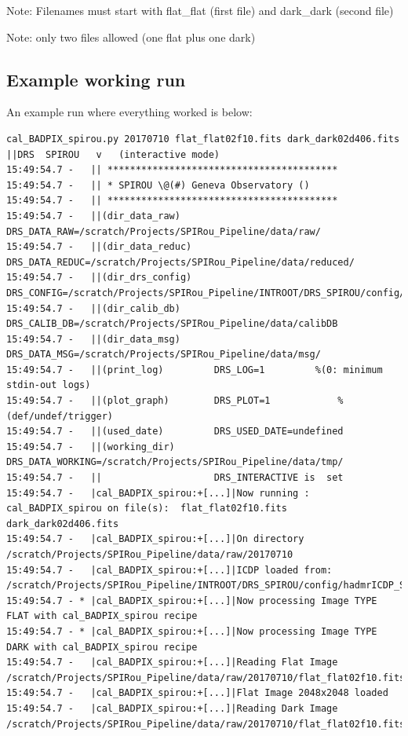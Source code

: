 \noindent Note: Filenames must start with flat\_flat (first file) and dark\_dark (second file)

\noindent Note: only two files allowed (one flat plus one dark)

\subsection{Example working run}

An example run where everything worked is below:

\begin{lstlisting}[style=text]
cal_BADPIX_spirou.py 20170710 flat_flat02f10.fits dark_dark02d406.fits
||DRS  SPIROU   v   (interactive mode)
15:49:54.7 -   || *****************************************
15:49:54.7 -   || * SPIROU \@(#) Geneva Observatory ()
15:49:54.7 -   || *****************************************
15:49:54.7 -   ||(dir_data_raw)      DRS_DATA_RAW=/scratch/Projects/SPIRou_Pipeline/data/raw/
15:49:54.7 -   ||(dir_data_reduc)    DRS_DATA_REDUC=/scratch/Projects/SPIRou_Pipeline/data/reduced/
15:49:54.7 -   ||(dir_drs_config)    DRS_CONFIG=/scratch/Projects/SPIRou_Pipeline/INTROOT/DRS_SPIROU/config/
15:49:54.7 -   ||(dir_calib_db)      DRS_CALIB_DB=/scratch/Projects/SPIRou_Pipeline/data/calibDB
15:49:54.7 -   ||(dir_data_msg)      DRS_DATA_MSG=/scratch/Projects/SPIRou_Pipeline/data/msg/
15:49:54.7 -   ||(print_log)         DRS_LOG=1         %(0: minimum stdin-out logs)
15:49:54.7 -   ||(plot_graph)        DRS_PLOT=1            %(def/undef/trigger)
15:49:54.7 -   ||(used_date)         DRS_USED_DATE=undefined
15:49:54.7 -   ||(working_dir)       DRS_DATA_WORKING=/scratch/Projects/SPIRou_Pipeline/data/tmp/
15:49:54.7 -   ||                    DRS_INTERACTIVE is  set
15:49:54.7 -   |cal_BADPIX_spirou:+[...]|Now running : cal_BADPIX_spirou on file(s):  flat_flat02f10.fits dark_dark02d406.fits
15:49:54.7 -   |cal_BADPIX_spirou:+[...]|On directory /scratch/Projects/SPIRou_Pipeline/data/raw/20170710
15:49:54.7 -   |cal_BADPIX_spirou:+[...]|ICDP loaded from: /scratch/Projects/SPIRou_Pipeline/INTROOT/DRS_SPIROU/config/hadmrICDP_SPIROU.py
15:49:54.7 - * |cal_BADPIX_spirou:+[...]|Now processing Image TYPE FLAT with cal_BADPIX_spirou recipe
15:49:54.7 - * |cal_BADPIX_spirou:+[...]|Now processing Image TYPE DARK with cal_BADPIX_spirou recipe
15:49:54.7 -   |cal_BADPIX_spirou:+[...]|Reading Flat Image /scratch/Projects/SPIRou_Pipeline/data/raw/20170710/flat_flat02f10.fits
15:49:54.7 -   |cal_BADPIX_spirou:+[...]|Flat Image 2048x2048 loaded
15:49:54.7 -   |cal_BADPIX_spirou:+[...]|Reading Dark Image /scratch/Projects/SPIRou_Pipeline/data/raw/20170710/flat_flat02f10.fits

\end{lstlisting}
